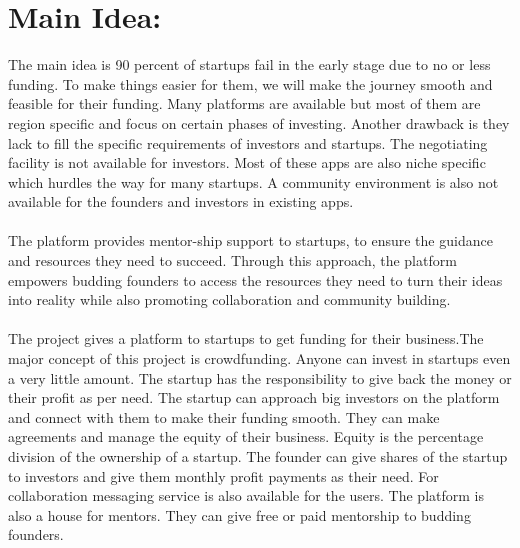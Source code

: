 \section{Main Idea:}
The main idea is 90 percent of startups fail in the early stage due to no or less funding. To make things easier for them, we will make the journey smooth and feasible for their funding. Many platforms are available but most of them are region specific and focus on certain phases of investing. Another drawback is they lack to fill the specific requirements of investors and startups. The negotiating facility is not available for investors. Most of these apps are also niche specific which hurdles the way for many startups. A community environment is also not available for the founders and investors in existing apps.
\\\\
The platform provides mentor-ship support to startups, to ensure the guidance and resources they need to succeed. Through this approach, the platform empowers budding founders to access the resources they need to turn their ideas into reality while also promoting collaboration and community building.
\\\\
The project gives a platform to startups to get funding for their business.The major concept of this project is crowdfunding. Anyone can invest in startups even a very little amount. The startup has the responsibility to give back the money or their profit as per need. The startup can approach big investors on the platform and connect with them to make their funding smooth. They can make agreements and manage the equity of their business. Equity is the percentage division of the ownership of a startup. The founder can give shares of the startup to investors and give them monthly profit payments as their need. For collaboration messaging service is also available for the users. The platform is also a house for mentors. They can give free or paid mentorship to budding founders.
